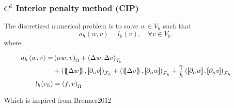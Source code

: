 \begin{frame}
\frametitle{ $C^0$ Interior penalty method (CIP) }

\begin{block}{}
The discretized numerical problem is to solve $w \in V_{h}$ such that
\begin{equation*}
\label{eq:CP_A_F}
a_{h}( w, v )   = l_{h}( v), \quad \forall v \in V_{h}  .
\end{equation*}
where

\begin{equation*}
\begin{split}
a_{h} \left( w, v \right)   =&
    \left( \alpha  w, v \right) _{\Omega }   +  \left( \Delta  w, \Delta v \right) _{\mathcal{T} _{h}} \\
 & +
  \left( \mean{  \Delta  w }, \jump{ \partial _{n }v} \right)_{\mathcal{F}_{h}}  +
 \left( \mean{ \Delta  v }, \jump{ \partial _{n}w }      \right)_{\mathcal{F}_{h}}  + \frac{\gamma }{h}  \left( \jump{ \partial _{n} w}, \jump{ \partial _{n} v   }   \right)_{\mathcal{F}_{h}} \\
 l_{h}( v_{h}) & =  \left( f, v \right) _{\Omega }
\end{split}
\end{equation*}

Which is inspired from Brenner2012 \footnotemark[1]
\end{block}


\end{frame}

